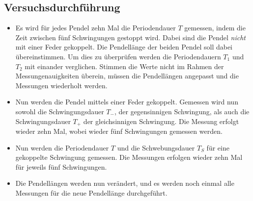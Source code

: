 \subsection{Versuchsdurchführung}
\begin{itemize}
    \item Es wird für jedes Pendel zehn Mal die Periodendauer $T$ gemessen, indem die Zeit zwischen fünf Schwingungen gestoppt wird. Dabei sind die Pendel 
        \textit{nicht} mit einer Feder gekoppelt. Die Pendellänge der beiden Pendel soll dabei übereinstimmen. Um dies zu überprüfen werden die Periodendauern 
        $T_1$ und $T_2$ mit einander verglichen. Stimmen die Werte nicht im Rahmen der Messungenauigkeiten überein, müssen die Pendellängen angepasst und die 
        Messungen wiederholt werden. 
    \item Nun werden die Pendel mittels einer Feder gekoppelt. Gemessen wird nun sowohl die Schwingungsdauer $T_-$, der gegensinnigen Schwingung, als auch die 
        Schwingungsdauer $T_+$ der gleichsinnigen Schwingung. Die Messung erfolgt wieder zehn Mal, wobei wieder fünf Schwingungen gemessen werden. 
    \item Nun werden die Periodendauer $T$ und die Schwebungsdauer $T_S$ für eine gekoppelte Schwingung gemessen. Die Messungen erfolgen wieder zehn Mal für 
        jeweils fünf Schwingungen.
    \item Die Pendellängen werden nun verändert, und es werden noch einmal alle Messungen für die neue Pendellänge durchgeführt.
\end{itemize}
